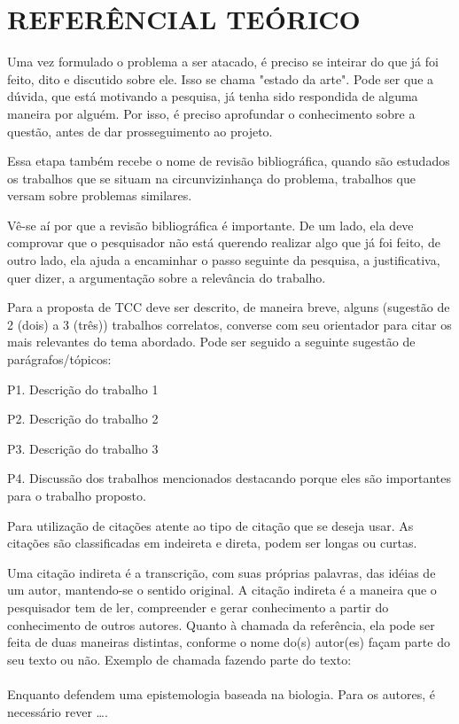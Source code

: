 \section{REFERÊNCIAL TEÓRICO}
\label{sec:estadoarte}



Uma vez formulado o problema a ser atacado, é preciso se inteirar do que já foi feito, dito e discutido sobre ele. Isso se chama "estado da arte". Pode ser que a dúvida, que está motivando a pesquisa, já tenha sido respondida de alguma maneira por alguém. Por isso, é preciso aprofundar o conhecimento sobre a questão, antes de dar prosseguimento ao projeto.

Essa etapa também recebe o nome de revisão bibliográfica, quando são estudados os trabalhos que se situam na circunvizinhança do problema, trabalhos que versam sobre problemas similares.

Vê-se aí por que a revisão bibliográfica é importante. De um lado, ela deve comprovar que o pesquisador não está querendo realizar algo que já foi feito, de outro lado, ela ajuda a encaminhar o passo seguinte da pesquisa, a justificativa, quer dizer, a argumentação sobre a relevância do trabalho.

Para a proposta de TCC deve ser descrito, de maneira breve, alguns (sugestão de 2 (dois) a 3 (três)) trabalhos correlatos, converse com seu orientador para citar os mais relevantes do tema abordado. Pode ser seguido a seguinte sugestão de parágrafos/tópicos:

P1. Descrição do trabalho 1

P2. Descrição do trabalho 2

P3. Descrição do trabalho 3

P4. Discussão dos trabalhos mencionados destacando porque eles são importantes para o trabalho proposto.

Para utilização de citações atente ao tipo de citação que se deseja usar. As citações são classificadas em indeireta e direta, podem ser longas ou curtas.

Uma citação indireta é a transcrição, com suas próprias palavras, das idéias de um autor, mantendo-se o sentido original. A citação indireta é a maneira que o pesquisador tem de ler, compreender e gerar conhecimento a partir do conhecimento de outros autores. Quanto à chamada da referência, ela pode ser feita de duas maneiras distintas, conforme o nome do(s) autor(es) façam parte do seu texto ou não. Exemplo de chamada fazendo parte do texto:\\
\\Enquanto {} defendem uma epistemologia baseada na biologia. Para os autores, é necessário rever \ldots.\\

